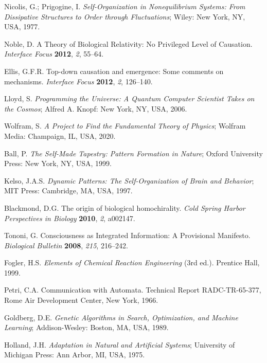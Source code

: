 \documentclass[preprint,12pt]{elsarticle}
\begin{document}
\begin{thebibliography}{999}
Nicolis, G.; Prigogine, I. \textit{Self-Organization in Nonequilibrium Systems: From Dissipative Structures to Order through Fluctuations}; Wiley: New York, NY, USA, 1977.

Noble, D. A Theory of Biological Relativity: No Privileged Level of Causation. \textit{Interface Focus} \textbf{2012}, \textit{2}, 55–64.

Ellis, G.F.R. Top-down causation and emergence: Some comments on mechanisms. \textit{Interface Focus} \textbf{2012}, \textit{2}, 126–140.

Lloyd, S. \textit{Programming the Universe: A Quantum Computer Scientist Takes on the Cosmos}; Alfred A. Knopf: New York, NY, USA, 2006.

Wolfram, S. \textit{A Project to Find the Fundamental Theory of Physics}; Wolfram Media: Champaign, IL, USA, 2020.

Ball, P. \textit{The Self-Made Tapestry: Pattern Formation in Nature}; Oxford University Press: New York, NY, USA, 1999.

Kelso, J.A.S. \textit{Dynamic Patterns: The Self-Organization of Brain and Behavior}; MIT Press: Cambridge, MA, USA, 1997.

Blackmond, D.G. The origin of biological homochirality. \textit{Cold Spring Harbor Perspectives in Biology} \textbf{2010}, \textit{2}, a002147.

Tononi, G. Consciousness as Integrated Information: A Provisional Manifesto. \textit{Biological Bulletin} \textbf{2008}, \textit{215}, 216–242.

Fogler, H.S. \textit{Elements of Chemical Reaction Engineering} (3rd ed.). Prentice Hall, 1999.

Petri, C.A. Communication with Automata. Technical Report RADC-TR-65-377, Rome Air Development Center, New York, 1966.

Goldberg, D.E. \textit{Genetic Algorithms in Search, Optimization, and Machine Learning}; Addison-Wesley: Boston, MA, USA, 1989.

Holland, J.H. \textit{Adaptation in Natural and Artificial Systems}; University of Michigan Press: Ann Arbor, MI, USA, 1975.


\end{thebibliography}
\end{document}

